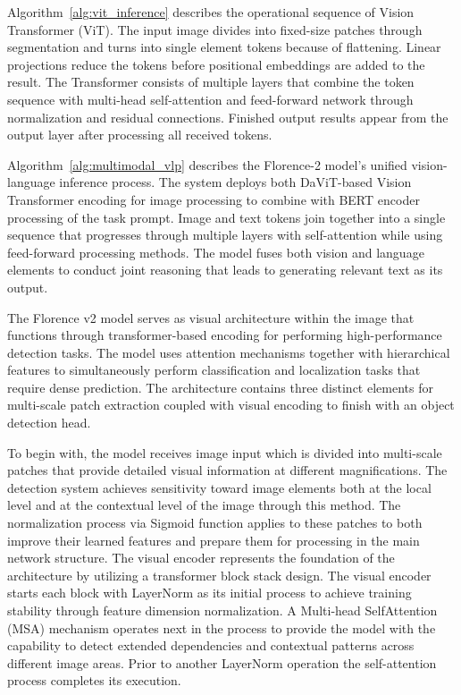 \documentclass[fleqn,10pt,lineno]{wlpeerj}
\begin{document}


Algorithm~\ref{alg:vit_inference} describes the operational sequence of Vision Transformer (ViT). The input image divides into fixed-size patches through segmentation and turns into single element tokens because of flattening. Linear projections reduce the tokens before positional embeddings are added to the result. The Transformer consists of multiple layers that combine the token sequence with multi-head self-attention and feed-forward network through normalization and residual connections. Finished output results appear from the output layer after processing all received tokens.



Algorithm~\ref{alg:multimodal_vlp} describes the Florence-2 model’s unified vision-language inference process. The system deploys both DaViT-based Vision Transformer encoding for image processing to combine with BERT encoder processing of the task prompt. Image and text tokens join together into a single sequence that progresses through multiple layers with self-attention while using feed-forward processing methods. The model fuses both vision and language elements to conduct joint reasoning that leads to generating relevant text as its output. 

The Florence v2 model serves as visual architecture within the image that functions through transformer-based encoding for performing high-performance detection tasks. The model uses attention mechanisms together with hierarchical features to simultaneously perform classification and localization tasks that require dense prediction. The architecture contains three distinct elements for multi-scale patch extraction coupled with visual encoding to finish with an object detection head.

To begin with, the model receives image input which is divided into multi-scale patches that provide detailed visual information at different magnifications. The detection system achieves sensitivity toward image elements both at the local level and at the contextual level of the image through this method. The normalization process via Sigmoid function applies to these patches to both improve their learned features and prepare them for processing in the main network structure. The visual encoder 
represents the foundation of the architecture by utilizing a transformer block stack design. The visual encoder starts each block with LayerNorm as its initial process to achieve training stability through feature dimension normalization. A Multi-head SelfAttention (MSA) mechanism operates next in the process to provide the model with the capability to detect extended dependencies and contextual patterns across different image areas. Prior to another LayerNorm operation the self-attention process completes its execution.
\end{document}
